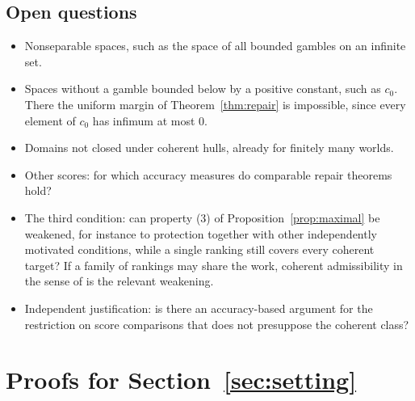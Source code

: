 \documentclass[11pt]{article}
\theoremstyle{plain}
\theoremstyle{definition}
\theoremstyle{remark}
\begin{document}
\subsection{Open questions}

\begin{itemize}
  \item Nonseparable spaces, such as the space of all bounded gambles on an infinite set.
  \item Spaces without a gamble bounded below by a positive constant, such as $c_0$. There the
  uniform margin of Theorem~\ref{thm:repair} is impossible, since every element of $c_0$ has
  infimum at most $0$.
  \item Domains not closed under coherent hulls, already for finitely many worlds.
  \item Other scores: for which accuracy measures do comparable repair theorems hold?
  \item The third condition: can property (3) of Proposition~\ref{prop:maximal} be weakened, for
  instance to protection together with other independently motivated conditions, while a single
  ranking still covers every coherent target? If a family of rankings may share the work,
  coherent admissibility in the sense of \cite{KCMcompanion} is the relevant weakening.
  \item Independent justification: is there an accuracy-based argument for the restriction on
  score comparisons that does not presuppose the coherent class?
\end{itemize}

\appendix

\section{Proofs for Section~\ref{sec:setting}}\label{app:setting}
\end{document}
